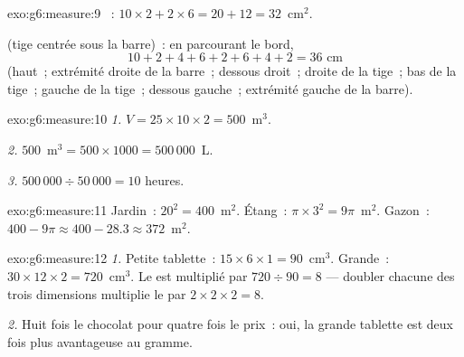 \begin{solution}{exo:g6:measure:9}
~: $10 \times 2 + 2 \times 6 = 20 + 12 = 32$~cm$^2$.

 (tige centrée sous la barre)~: en parcourant le bord,
\[
10 + 2 + 4 + 6 + 2 + 6 + 4 + 2 = 36 \text{ cm}
\]
(haut~; extrémité droite de la barre~; dessous droit~; droite de la
tige~; bas de la tige~; gauche de la tige~; dessous gauche~;
extrémité gauche de la barre).
\end{solution}

\begin{solution}{exo:g6:measure:10}
\emph{1.} $V = 25 \times 10 \times 2 = 500$~m$^3$.

\emph{2.} $500$~m$^3 = 500 \times 1000 = 500\,000$~L.

\emph{3.} $500\,000 \div 50\,000 = 10$ heures.
\end{solution}

\begin{solution}{exo:g6:measure:11}
Jardin~: $20^2 = 400$~m$^2$. Étang~: $\pi \times 3^2 = 9\pi$~m$^2$.
Gazon~: $400 - 9\pi \approx 400 - 28.3 \approx 372$~m$^2$.
\end{solution}

\begin{solution}{exo:g6:measure:12}
\emph{1.} Petite tablette~: $15 \times 6 \times 1 = 90$~cm$^3$.
Grande~: $30 \times 12 \times 2 = 720$~cm$^3$. Le  est
multiplié par $720 \div 90 = 8$ --- doubler chacune des trois
dimensions multiplie le  par $2 \times 2 \times 2 = 8$.

\emph{2.} Huit fois le chocolat pour quatre fois le prix~: oui, la
grande tablette est deux fois plus avantageuse au gramme.
\end{solution}

